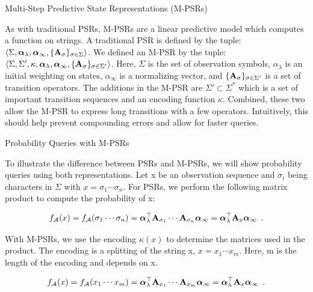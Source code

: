 \documentclass[final]{beamer}
\newcommand{\psrsigma}{\langle \Sigma, \aone, \ainf, \{\A_\sigma\}_{\sigma \in \Sigma} \rangle}
\newcommand{\mpsrsigma}{\langle \Sigma, \Sigma', \kappa, \aone, \ainf, \{\A_\sigma\}_{\sigma \in \Sigma'} \rangle}
\newlength{\twocolwid}
\begin{document}
\begin{frame}[t]
\begin{columns}[t]
\begin{column}{\twocolwid}
\begin{columns}[t,totalwidth=\twocolwid]
\begin{column}{\twocolwid}\vspace{-.6in} %

\begin{block}{Multi-Step Predictive State Representations (M-PSRs)}

As with traditional PSRs, M-PSRs are a linear predictive model which computes a function on strings. A traditional PSR is defined by the tuple: $\psrsigma$. We defined an M-PSR by the tuple: $\mpsrsigma$. Here, $\Sigma$ is the set of observation symbols, $\alpha_{\lambda}$ is an initial weighting on states, $\alpha_{\infty}$ is a normalizing vector, and $\{\mathbf{A}_\sigma\}_{\sigma \in \Sigma'}$ is a set of transition operators. The additions in the M-PSR are $\Sigma' \subset \Sigma^*$ which is a set of important transition sequences and an encoding function $\kappa$. Combined, these two allow the M-PSR to express long transitions with a few operators. Intuitively, this should help prevent compounding errors and allow for faster queries.

\end{block}

\begin{block}{Probability Queries with M-PSRs}

To illustrate the difference between PSRs and M-PSRs, we will show probability queries using both representations. Let x be an observation sequence and $\sigma_i$ being characters in $\Sigma$ with $x=\sigma_1 \cdots \sigma_n$. For PSRs, we perform the following matrix product to compute the probability of x:

\begin{equation*}
f_{\mathcal{A}}(x) = f_{\mathcal{A}}(\sigma_1 \cdots \sigma_n) = \boldsymbol{\alpha}_\lambda^\top \mathbf{A}_{\sigma_1} \cdots \mathbf{A}_{\sigma_n} \boldsymbol{\alpha}_{\infty} = \boldsymbol{\alpha}_\lambda^\top \mathbf{A}_x \boldsymbol{\alpha}_{\infty} \enspace.
\end{equation*}

With M-PSRs, we use the encoding $\kappa(x)$ to determine the matrices used in the product. The encoding is a splitting of the string x, $x=x_1 \cdots x_m$. Here, m is the length of the encoding and depends on x.

\begin{equation*}
f_{\mathcal{A}}(x) = f_{\mathcal{A}}(x_1 \cdots x_m) = \boldsymbol{\alpha}_\lambda^\top \mathbf{A}_{x_1} \cdots \mathbf{A}_{x_m} \boldsymbol{\alpha}_{\infty} = \boldsymbol{\alpha}_\lambda^\top \mathbf{A}_x \boldsymbol{\alpha}_{\infty} \enspace.
\end{equation*}



\end{block}
\end{column}
\end{columns}
\end{column}
\end{columns}
\end{frame}
\end{document}

